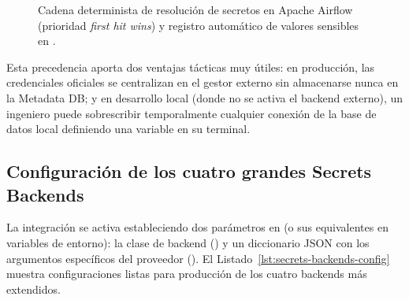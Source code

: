 \begin{figure}[htbp]
{%
}
\caption{Cadena determinista de resolución de secretos en Apache Airflow (prioridad \textit{first hit wins}) y registro automático de valores sensibles en .}
\label{fig:secrets-resolution-chain}
\end{figure}

Esta precedencia aporta dos ventajas tácticas muy útiles: en producción, las credenciales oficiales se centralizan en el gestor externo sin almacenarse nunca en la Metadata DB; y en desarrollo local (donde no se activa el backend externo), un ingeniero puede sobrescribir temporalmente cualquier conexión de la base de datos local definiendo una variable  en su terminal.

\subsection{Configuración de los cuatro grandes Secrets Backends}

La integración se activa estableciendo dos parámetros en  (o sus equivalentes en variables de entorno): la clase de backend () y un diccionario JSON con los argumentos específicos del proveedor (). El Listado~\ref{lst:secrets-backends-config} muestra configuraciones listas para producción de los cuatro backends más extendidos.

